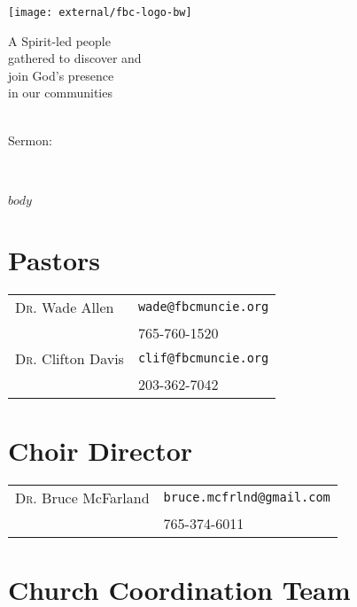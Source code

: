 \documentclass[
notumble,
nofoldmark,
letterpaper,
]{leaflet}
\begin{document}
\begin{titlepage}
\centering
\vfill
{\centering
\texttt{[image: external/fbc-logo-bw]}\par}
\vfill
\large A Spirit-led people \\ gathered to discover and \\ join God's presence \\ in our communities
\vfill

\LARGE\sundaydate\\
\vfill
\large Sermon:\\
\LARGE\sermontitle\\
\LARGE\scripture\\

\vfill
\end{titlepage}
\thispagestyle{empty}

$body$

\vfill



\vfill

\section{Pastors}
\begin{tabular}{@{}ll}
\textsc{Dr.} Wade Allen & \verb|wade@fbcmuncie.org|\\
 & 765-760-1520 \\
 \textsc{Dr.} Clifton Davis & \verb|clif@fbcmuncie.org|\\
 & 203-362-7042 \\
\end{tabular}

\vfill

\section{Choir Director}
\begin{tabular}{@{}ll}
\textsc{Dr.} Bruce McFarland & \verb|bruce.mcfrlnd@gmail.com|\\
 & 765-374-6011 \\
\end{tabular}

\vfill

\section{Church Coordination Team}
\end{document}
